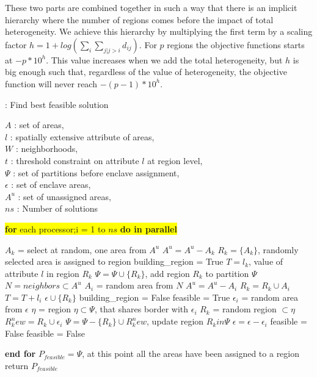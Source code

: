 \documentclass[conference]{IEEEtran}
\begin{document}
These two parts are combined together in such a way that there is an implicit
hierarchy where the number of regions comes before the impact of total
heterogeneity. We achieve this hierarchy by multiplying the first term by a
scaling factor $h = 1 + log(\sum_i \sum_{j|j>i} d_{ij})$. For $p$ regions the
objective functions starts at $−p\ast10^h$. This value increases when we add the
total heterogeneity, but $h$ is big enough such that, regardless of the value of
heterogeneity, the objective function will never reach $-(p-1) \ast 10^h$.

\begin{algorithm}
\scriptsize
\caption{: Find best feasible solution~\cite{r1}}
$A$ : set of areas,\\
$l$ : spatially extensive attribute of areas,\\
$W$ : neighborhoods,\\
$t$ : threshold constraint on attribute $l$ at region level,\\
$\Psi$ : set of partitions before enclave assignment,\\
$\epsilon$ : set of enclave areas,\\
$A^u$ : set of unassigned areas,\\
$ns$ : Number of solutions\\
\begin{algorithmic}
\vbox{\colorbox{yellow}{\vbox{\STATE \textbf{for} each processor;i = 1 to $ns$ \textbf{do in parallel}}}} 
\begin{ALC@g}
		\STATE $A_k$ = select at random, one area from $A^u$
		\STATE $A^u = A^u - A_k$
		\STATE $R_k = \{A_k\}$, randomly selected area is assigned to region
		\STATE building\_region = True
		\STATE $T = l_k$, value of attribute $l$ in region $R_k$
				\STATE $\Psi = \Psi \cup \{R_k\}$, add region $R_k$ to partition $\Psi$
			\ELSE
				\STATE $N = neighbors \subset A^u$%
					\STATE $A_i$ = random area from $N$
					\STATE $A^u = A^u - A_i$
					\STATE $R_k = R_k \cup A_i$
					\STATE $T = T + l_i$
				\ELSE
					\STATE $\epsilon \cup \{R_k\}$
					\STATE building\_region = False
				\ENDIF
			\ENDIF
		\ENDWHILE
	\ENDWHILE
		\STATE feasible = True
			\STATE $\epsilon_i$ = random area from $\epsilon$
			\STATE $\eta$ = region $\eta \subset \Psi $, that shares border with $\epsilon_i$
				\STATE $R_k$ = random region $\subset \eta$
				\STATE $R_k^new = R_k \cup \epsilon_i$
				\STATE $\Psi = \Psi - \{R_k\} \cup R_k^new$, update region $R_k in \Psi$
				\STATE $\epsilon = \epsilon - \epsilon_i$
			\ELSE
				\STATE feasible = False
			\ENDIF
		\ENDWHILE
	\ELSE
		\STATE feasible = False
	\ENDIF
\end{ALC@g}
\STATE \textbf{end for}
\STATE $P_{feasible} = \Psi$, at this point all the areas have been assigned to a region
\STATE return $P_{feasible}$
\end{algorithmic}
\end{algorithm}
\end{document}
